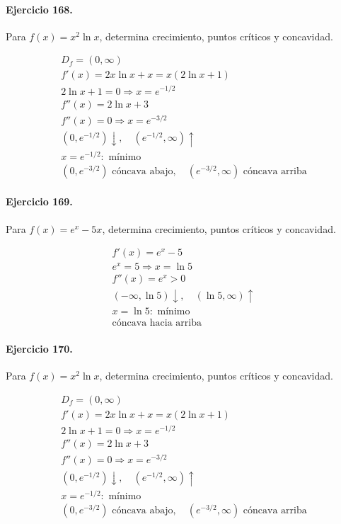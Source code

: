 \documentclass[11pt,a4paper]{article}
\begin{document}
\paragraph{Ejercicio 168.} Para $f(x)=x^2\ln x$, determina crecimiento, puntos críticos y concavidad.

\[
\begin{aligned}
D_f=(0,\infty)\\
f'(x)=2x\ln x+x=x(2\ln x+1)\\
2\ln x+1=0\Rightarrow x=e^{-1/2}\\
f''(x)=2\ln x+3\\
f''(x)=0\Rightarrow x=e^{-3/2}\\
(0,e^{-1/2})\downarrow,\quad(e^{-1/2},\infty)\uparrow\\
x=e^{-1/2}:\text{{ mínimo}}\\
(0,e^{-3/2})\text{{ cóncava abajo}},\quad(e^{-3/2},\infty)\text{{ cóncava arriba}}
\end{aligned}
\]


\paragraph{Ejercicio 169.} Para $f(x)=e^x-5x$, determina crecimiento, puntos críticos y concavidad.

\[
\begin{aligned}
f'(x)=e^x-5\\
e^x=5\Rightarrow x=\ln 5\\
f''(x)=e^x>0\\
(-\infty,\ln 5)\downarrow,\quad(\ln 5,\infty)\uparrow\\
x=\ln 5:\text{ mínimo}\\
\text{{cóncava hacia arriba}}
\end{aligned}
\]


\paragraph{Ejercicio 170.} Para $f(x)=x^2\ln x$, determina crecimiento, puntos críticos y concavidad.

\[
\begin{aligned}
D_f=(0,\infty)\\
f'(x)=2x\ln x+x=x(2\ln x+1)\\
2\ln x+1=0\Rightarrow x=e^{-1/2}\\
f''(x)=2\ln x+3\\
f''(x)=0\Rightarrow x=e^{-3/2}\\
(0,e^{-1/2})\downarrow,\quad(e^{-1/2},\infty)\uparrow\\
x=e^{-1/2}:\text{{ mínimo}}\\
(0,e^{-3/2})\text{{ cóncava abajo}},\quad(e^{-3/2},\infty)\text{{ cóncava arriba}}
\end{aligned}
\]
\end{document}
